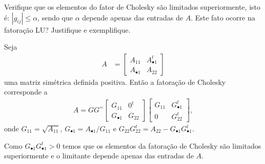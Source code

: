 \documentclass[a4paper,12pt, leqno, answers]{exam}
\newcommand{\mdot}{\bullet}
\begin{document}
\begin{questions}
    \question Verifique que os elementos do fator de Cholesky s\~{a}o limitados superiormente, isto \'{e}: $| g_{ij} | \leq \alpha$, sendo que $\alpha$ depende apenas das entradas de $A$. Este fato ocorre na fatora\c{c}\~{a}o LU? Justifique e exemplifique.
    \begin{solution}
        Seja
        \begin{align*}
            A &= \begin{bmatrix}
                A_{11} & A_{\mdot 1}^t \\
                A_{\mdot 1} & A_{22}
            \end{bmatrix}
        \end{align*}
        uma matriz sim\'{e}trica definida positiva. Ent\~{a}o a fatora\c{c}\~{a}o de Cholesky corresponde a
        \begin{align*}
            A = G G^ = \begin{bmatrix}
                G_{11} & 0^t \\
                G_{\mdot 1} & G_{22}
            \end{bmatrix} \begin{bmatrix}
                G_{11} & G_{\mdot 1}^t \\
                0 & G_{22}^t
            \end{bmatrix},
        \end{align*}
        onde $G_{11} = \sqrt{A_{11}}$, $G_{\mdot 1} = A_{\mdot 1} / G_{11}$ e $G_{22} G_{22}^t = A_{22} - G_{\mdot 1} G_{\mdot 1}^t$.

        Como $G_{\mdot 1} G_{\mdot 1}^t > 0$ temos que os elementos da fatora\c{c}\~{a}o de Cholesky s\~{a}o limitados superiormente e o limitante depende apenas das entradas de $A$.
    \end{solution}


\end{questions}
\end{document}
